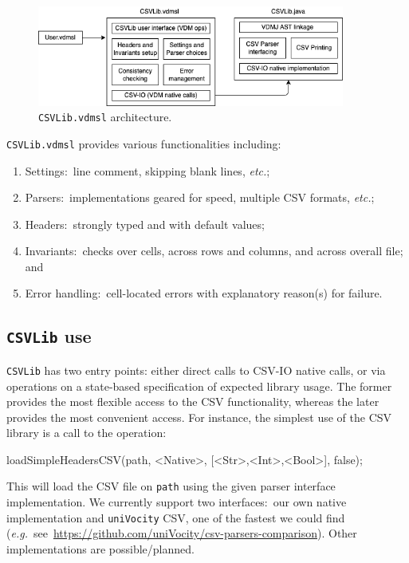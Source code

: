 \documentclass[runningheads,a4paper]{llncs}
\begin{document}
\begin{figure}[htbp]
   \centering
       \includegraphics[width=0.90\textwidth]{figures/CSVLibArchitecture.png}
   \caption{\texttt{CSVLib.vdmsl} architecture.}\label{fig:CSVLibArchitecture}
\end{figure}

\noindent\texttt{CSVLib.vdmsl} provides various functionalities including:
%
\begin{enumerate}
    \item Settings:~line comment, skipping blank lines, \textit{etc.};
    \item Parsers:~implementations geared for speed, multiple CSV formats, \textit{etc.};
    \item Headers:~strongly typed and with default values;
    \item Invariants:~checks over cells, across rows and columns, and across overall file; and
    \item Error handling:~cell-located errors with explanatory reason(s) for failure.
\end{enumerate} 

\subsection*{\texttt{CSVLib} use}

\texttt{CSVLib} has two entry points: either direct calls to CSV-IO native calls, or via operations on a state-based specification of expected library usage. The former provides the most flexible access to the CSV functionality, whereas the later provides the most convenient access. For instance, the simplest use of the CSV library is a call to the operation:
%
\begin{vdmsl}[frame=none,basicstyle=\ttfamily\scriptsize]
    loadSimpleHeadersCSV(path, <Native>, [<Str>,<Int>,<Bool>], false);
\end{vdmsl}
%
This will load the CSV file on \texttt{path} using the given parser interface implementation. We currently support two interfaces:~our own native implementation and \texttt{uniVocity} CSV, one of the fastest we could find (\textit{e.g.}~see~\url{https://github.com/uniVocity/csv-parsers-comparison}). Other implementations are possible/planned. 
\end{document}
